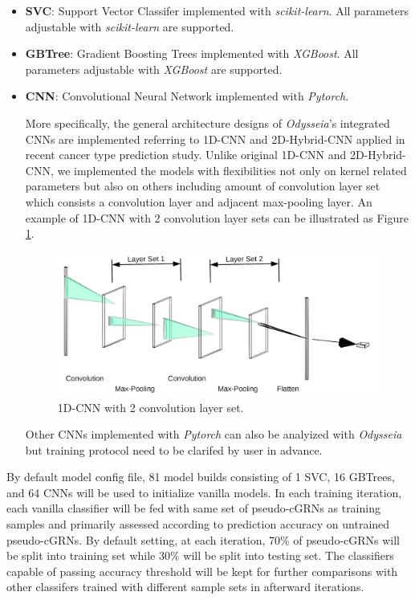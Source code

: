 \documentclass[fleqn,10pt]{wlscirep}
\begin{document}
\begin{itemize}
\setlength\itemsep{0em}
\item \textbf{SVC}: Support Vector Classifer implemented with \emph{scikit-learn}.\cite{scikit-learn}
All parameters adjustable with \emph{scikit-learn}\cite{scikit-learn} are supported.
\item \textbf{GBTree}: Gradient Boosting Trees implemented with \emph{XGBoost}.\cite{chen2016xgboost}
All parameters adjustable with \emph{XGBoost}\cite{chen2016xgboost} are supported.
\item \textbf{CNN}: Convolutional Neural Network implemented with \emph{Pytorch}\cite{NEURIPS2019_9015}.

More specifically, the general architecture designs of \emph{Odysseia}'s integrated CNNs are implemented referring to 1D-CNN and 2D-Hybrid-CNN applied in recent cancer type prediction study\cite{mostavi_chiu_huang_chen_2020}.
Unlike original 1D-CNN and 2D-Hybrid-CNN, we implemented the models with flexibilities not only on kernel related parameters but also on others including amount of convolution layer set which consists a convolution layer and adjacent max-pooling layer.
An example of 1D-CNN with 2 convolution layer sets can be illustrated as Figure \ref{1dCNN}.
\begin{figure}[ht]
\centering
\includegraphics[width=0.8\linewidth]{image/nn.png}
\caption{1D-CNN with 2 convolution layer set.}
\label{1dCNN}
\end{figure}

Other CNNs implemented with \emph{Pytorch}\cite{NEURIPS2019_9015} can also be analyized with \emph{Odysseia} but training protocol need to be clarifed by user in advance.
\end{itemize}

By default model config file, 81 model builds consisting of 1 SVC, 16 GBTrees, and 64 CNNs will be used to initialize vanilla models.
In each training iteration, each vanilla classifier will be fed with same set of pseudo-cGRNs as training samples and primarily assessed according to prediction accuracy on untrained pseudo-cGRNs.
By default setting, at each iteration, 70\% of pseudo-cGRNs will be split into training set while 30\% will be split into testing set.
The classifiers capable of passing accuracy threshold will be kept for further comparisons with other classifers trained with different sample sets in afterward iterations.
\end{document}
